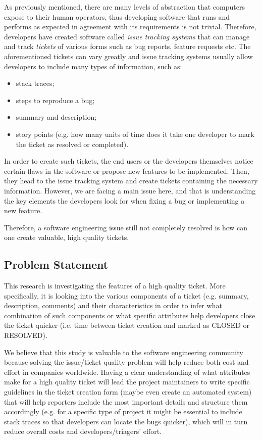 \documentclass{mprop}
\begin{document}
As previously mentioned, there are many levels of abstraction that computers expose to 
their human operators, thus developing software that runs and performs as expected
in agreement with its requirements is not trivial. Therefore, developers have
created software called \emph{issue tracking systems} that can manage
and track \emph{tickets} of various forms such as bug 
reports, feature requests etc. The aforementioned tickets can vary greatly
and issue tracking systems usually allow developers to include many 
types of information, such as:
  \begin{itemize}
    \item stack traces;
    \item steps to reproduce a bug;
    \item summary and description;
    \item story points (e.g. how many units of time does it take one
      developer to mark the ticket as resolved or completed).
  \end{itemize}
In order to create such tickets, the end users or the developers 
themselves notice certain flaws in the software or propose new features
to be implemented. Then, they head to the issue tracking system and 
create tickets containing the necessary information.
However, we are facing a main issue here, and that is understanding the
key elements the developers look for when fixing a bug or implementing a 
new feature.

Therefore, a software engineering issue still not completely resolved
is how can one create valuable, high quality tickets.

\subsection{Problem Statement}

This research is investigating the features of a high quality ticket.
More specifically, it is looking into the various components 
of a ticket (e.g. summary, description, comments) and their characteristics
in order to infer what combination of such components or what specific
attributes help developers close the ticket quicker (i.e. time between
ticket creation and marked as CLOSED or RESOLVED). 

We believe that this study is valuable to the software engineering 
community because solving the issue/ticket quality problem will help
reduce both cost and effort in companies worldwide. 
Having a clear understanding of what attributes make for 
a high quality ticket will lead the project maintainers to write  
specific guidelines in the ticket creation form (maybe even create an 
automated system) that will help reporters include the most
important details and structure them accordingly (e.g. for a specific
type of project it might be essential to include stack traces so that
developers can locate the bugs quicker), which will in turn reduce
overall costs and developers/triagers' effort.
\end{document}
